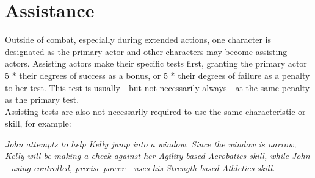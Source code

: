 \documentclass[11pt,a4paper,openany,dvipsnames]{book}
\begin{document}
	\section{Assistance}
	Outside of combat, especially during extended actions,
		one character is designated as the primary actor and other characters may become assisting actors.
	Assisting actors make their specific tests first,
		granting the primary actor 5 * their degrees of success as a bonus,
		or 5 * their degrees of failure as a penalty to her test.
	This test is usually - but not necessarily always - at the same penalty as the primary test.
	\\%
	Assisting tests are also not necessarily required to use the same characteristic or skill, for example:\par
	\begin{exampleblock}
		\itshape
		John attempts to help Kelly jump into a window.
		Since the window is narrow,
			Kelly will be making a check against her \emph{Agility}-based Acrobatics skill,
			while John - using controlled, precise power - uses his \emph{Strength}-based Athletics skill.
	\end{exampleblock}
\end{document}
